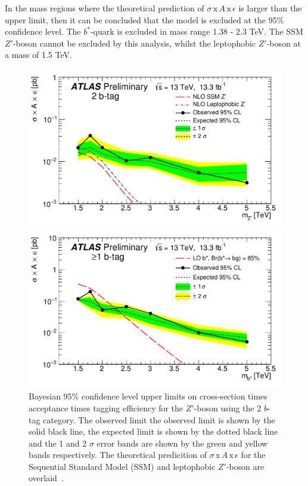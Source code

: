 In the mass regions where the theoretical prediction of $\sigma\,\text{x}\,\mathit{A}\,\text{x}\,\epsilon$
is larger than the upper limit, then it can be concluded that the model is excluded at the 95\% confidence level.
The $b^*$-quark is excluded in mass range 1.38 - 2.3 TeV.
The SSM $Z'$-boson cannot be excluded by this analysis,
whilst the leptophobic $Z'$-boson at a mass of 1.5 TeV.

\begin{figure}[!ht]
  \centering
   \includegraphics[width=0.9\linewidth, angle=0]{figs/Dibjet/ICHEP/lim-zprime.pdf}
   \caption[Bayesian 95\% confidence level upper limits on cross-section times acceptance times tagging efficiency
    for the $Z'$-boson using the 2 $b$-tag category.
    The observed limit the observed limit is shown by the solid black line,
    the expected limit is shown by the dotted black line
    and the 1 and 2 $\sigma$ error bands are shown by the green and yellow bands respectively.
    The theoretical predicition of $\sigma\,\text{x}\,\mathit{A}\,\text{x}\,\epsilon$
    for the Sequential Standard Model (SSM) and leptophobic $Z'$-boson are overlaid.]
           {Bayesian 95\% confidence level upper limits on cross-section times acceptance times tagging efficiency
    for the $Z'$-boson using the 2 $b$-tag category.
    The observed limit the observed limit is shown by the solid black line,
    the expected limit is shown by the dotted black line
    and the 1 and 2 $\sigma$ error bands are shown by the green and yellow bands respectively.
    The theoretical predicition of $\sigma\,\text{x}\,\mathit{A}\,\text{x}\,\epsilon$
    for the Sequential Standard Model (SSM) and leptophobic $Z'$-boson are overlaid~\cite{dibjet-ichep_conf}.
  }
  \label{fig:lim-summer_zprime}
  \vspace{1cm}
  \centering
   \includegraphics[width=0.9\linewidth, angle=0]{figs/Dibjet/ICHEP/lim-bstar.pdf}

\end{figure}
